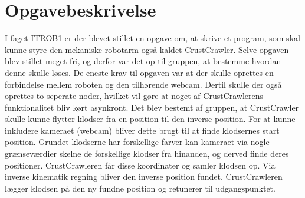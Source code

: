 \chapter{Opgavebeskrivelse}\label{chap:Opgavebeskrivelse}
I faget ITROB1 er der blevet stillet en opgave om, at skrive et program, som skal kunne styre den mekaniske robotarm også kaldet CrustCrawler. Selve opgaven blev stillet meget fri, og derfor var det op til gruppen, at bestemme hvordan denne skulle løses. De eneste krav til opgaven var at der skulle oprettes en forbindelse mellem roboten og den tilhørende webcam. Dertil skulle der også oprettes to seperate noder, hvilket vil gøre at noget af CrustCrawlerens funktionalitet bliv kørt asynkront. \newline
Det blev bestemt af gruppen, at CrustCrawler skulle kunne flytter klodser fra en position til den inverse position. For at kunne inkludere kameraet (webcam) bliver dette brugt til at finde klodsernes start position. Grundet klodserne har forskellige farver kan kameraet via nogle grænseværdier skelne de forskellige klodser fra hinanden, og derved finde deres positioner. CrustCrawleren får disse koordinater og samler klodsen op. Via inverse kinematik regning bliver den inverse position fundet. CrustCrawleren lægger klodsen på den ny fundne position og retunerer til udgangspunktet. 